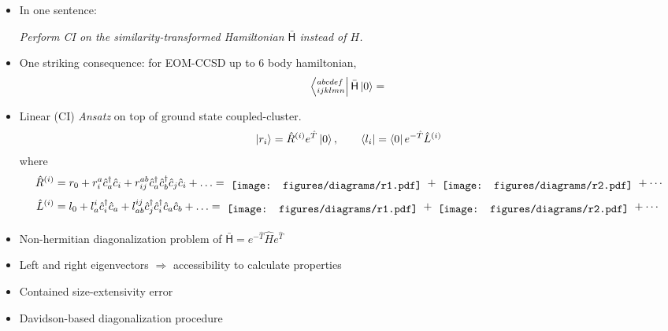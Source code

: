 \begin{itemize}
  \item
    In one sentence:
    \begin{center}
      \textit{
      Perform \emph{CI} on the similarity-transformed Hamiltonian $\bar{\mathsf{H}}$
      instead of $H$.
    }
    \end{center}
  \item
    One striking consequence: for EOM-CCSD up to 6 body hamiltonian,
  $$
    \bra{^{abcdef}_{ijklmn}} \bar{\mathsf{H}} \ket{0}
    =
    \begin{tikzpicture}[baseline, line width=2, scale=5]
      
    \end{tikzpicture}
  $$

  \item
    Linear (CI) \textit{Ansatz} on top of ground state coupled-cluster.
    \begin{align*}
      \left| r_i \right> = \hat{R} ^{(i)} e^{\hat{T}} \left| 0 \right>, \qquad
      \left< l_i \right| = \left< 0 \right| e^{-\hat{T}} \hat{L}^{(i)}
    \end{align*}
    where
      \begin{align*}
        \hat{R} ^{(i)} &= r _{0}
         + r ^{a} _{i} \hat{c} ^{\dagger} _{a} \hat{c} _{i}
         + r ^{ab} _{ij} \hat{c} ^{\dagger} _{a} \hat{c} ^{\dagger} _{b}
                \hat{c} _{j} \hat{c} _{i}
         + \ldots
        =
        \tikz[baseline]\node{\texttt{[image: figures/diagrams/r1.pdf]}};
        +
        \tikz[baseline]\node{\texttt{[image: figures/diagrams/r2.pdf]}};
        +
        \cdots
        \\
        \hat{L} ^{(i)} &= l _{0}
                       + l ^{i} _{a} \hat{c} _{i}^{\dagger} \hat{c} _{a}
                       + l ^{ij} _{ab}
                          \hat{c} _{j} ^{\dagger} \hat{c} _{i}^{\dagger}
                          \hat{c} _{a} \hat{c} _{b}
                       + \ldots
        =
        \tikz[baseline]\node{\texttt{[image: figures/diagrams/r1.pdf]}};
        +
        \tikz[baseline]\node{\texttt{[image: figures/diagrams/r2.pdf]}};
        +
        \cdots
      \end{align*}

  \item
    Non-hermitian diagonalization problem of
      $ \bar{\mathsf{H}} = e^{-\hat{T}} \hat{H} e^{\hat{T}}$

  \item
    Left and right eigenvectors $ \Rightarrow $ accessibility to calculate
    properties

  \item
    Contained size-extensivity error

  \item
    Davidson-based diagonalization procedure

\end{itemize}

